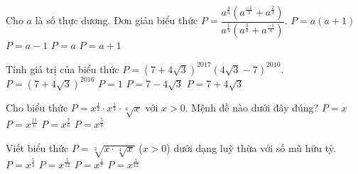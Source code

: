 \begin{ex}%
	Cho $a$ là số thực dương. Đơn giản  biểu thức $P=\dfrac{a^{\tfrac{4}{3}}\left(a^{\tfrac{-1}{3}}+a^{\tfrac{2}{3}}\right)}{a^{\tfrac{1}{4}}\left(a^{\tfrac{3}{4}}+a^{\tfrac{-1}{4}}\right)}$.
	 \choice
		 {$P=a\left(a+1\right)$}
		{$P=a-1$} 
		{\True $P=a$} 
		{$P=a+1$} 
\end{ex}

\begin{ex}%
	 [Đề Tham Khảo 2017] Tính giá trị của biểu thức $P=(7+4\sqrt{3})^{2017}(4\sqrt{3}-7)^{2016}$.
	 \choice
		{$P=(7+4\sqrt{3})^{2016}$} 
		 {$P=1$}
		{$P=7-4\sqrt{3}$} 
		 {\True $P=7+4\sqrt{3}$}
\end{ex}

\begin{ex}%
	Cho biểu thức $P=x^{\tfrac{1}{2}}\cdot x^{\tfrac{1}{3}}\cdot \sqrt[6]{x}$ với $x>0$. Mệnh  đề nào dưới đây đúng?
	\choice 
		{\True $P=x$} 
		 {$P=x^{\tfrac{11}{6}}$}
		 {$P=x^{\tfrac{7}{6}}$}
		 {$P=x^{\tfrac{5}{6}}$}
\end{ex}

\begin{ex}%
	Viết biểu thức $P=\sqrt[3]{x\cdot \sqrt[4]x}$ ($x>0$) dưới  dạng luỹ thừa với số mũ hữu tỷ.
	\choice 
		{$P=x^{\tfrac{5}{4}}$} 
		{\True $P=x^{\tfrac{5}{12}}$} 
		{$P=x^{\tfrac{1}{7}}$} 
		{$P=x^{\tfrac{1}{12}}$} 
\end{ex}


